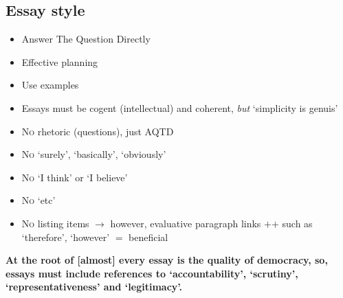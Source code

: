 \documentclass[12pt,a4paper]{article}
\begin{document}
\subsection*{Essay style}

\begin{itemize}
	\item{Answer The Question Directly}
	\item{Effective planning}
	\item{Use examples}
	\item{Essays must be cogent (intellectual) and coherent, \textit{but} `simplicity is genuis'}
\end{itemize}

\begin{itemize}
	\item{\textsc{No} rhetoric (questions), just AQTD}
	\item{\textsc{No} `surely', `basically', `obviously'}
	\item{\textsc{No} `I think' or `I believe'}
	\item{\textsc{No} `etc'}
	\item{\textsc{No} listing items $\rightarrow$ however, evaluative paragraph links $+$$+$ such as `therefore', `however' $=$ beneficial}
\end{itemize}

\textbf{At the root of [almost] every essay is the quality of democracy, so, essays must include references to `accountability', `scrutiny', `representativeness' and `legitimacy'.}
\end{document}
